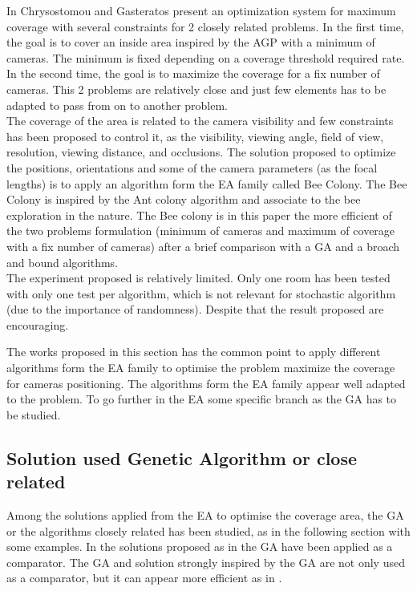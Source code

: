  In Chrysostomou and Gasteratos \cite{82*chrysostomou2012} present an optimization system for maximum coverage with several constraints for 2 closely related problems. In the first time, the goal is to cover an inside area inspired by the AGP with a minimum of cameras.  The minimum is fixed depending  on a coverage threshold required rate. In the second time, the goal is to maximize the coverage for a fix number of cameras. This 2 problems are relatively close and just few elements has to be adapted to pass from on to another problem.\\
The coverage of the area is related to the camera visibility and few constraints has been proposed to control it, as the visibility, viewing angle, field of view, resolution, viewing distance, and occlusions. The solution proposed to optimize the positions, orientations and some of the camera parameters (as the focal lengths) is to apply an algorithm form the EA family called Bee Colony. The Bee Colony is inspired by the Ant colony algorithm and associate to the bee exploration in the nature. The Bee colony is in this  paper \cite{82*chrysostomou2012} the more efficient of the two problems formulation (minimum of cameras and maximum of coverage with a fix number of cameras) after a brief comparison with a GA and a broach and bound algorithms. \\
The experiment proposed is relatively limited. Only one room has been tested with only one test per algorithm, which is not relevant for stochastic algorithm (due to the importance of randomness). Despite that the result proposed are encouraging. 

The works proposed in this section has the common point to apply different algorithms form the EA family to optimise the problem maximize the coverage for cameras positioning. The algorithms form the EA family appear well adapted to the problem. To go further in the EA some specific branch as the GA has to be studied.

\subsection{Solution used Genetic Algorithm or close related}

 Among the solutions applied from the EA to optimise the coverage area, the GA or the algorithms closely related has been studied, as in the following section with some examples.
 In the solutions proposed as in \cite{82*chrysostomou2012,33*reddy2012,141*akbarzadeh2013} the GA have been applied as a comparator. The GA and solution strongly inspired by the GA  are not only used as a comparator, but it can appear more efficient as in \cite{83*van2009,101*topcuoglu2009,165*jiang2010,152*wang2009}.



